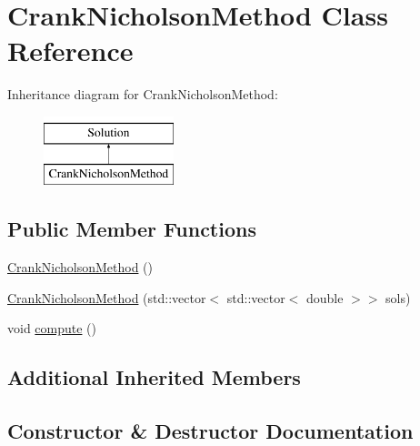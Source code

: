 \hypertarget{class_crank_nicholson_method}{}\section{Crank\+Nicholson\+Method Class Reference}
\label{class_crank_nicholson_method}
Inheritance diagram for Crank\+Nicholson\+Method\+:\begin{figure}[H]
\begin{center}
\leavevmode
\includegraphics[height=2.000000cm]{class_crank_nicholson_method}
\end{center}
\end{figure}
\subsection*{Public Member Functions}
\begin{DoxyCompactItemize}
\item 
\hyperlink{class_crank_nicholson_method_ae5052444cd3f042a554bb74d9ac556e0}{Crank\+Nicholson\+Method} ()
\item 
\hyperlink{class_crank_nicholson_method_a9738c40cac3d4f37775d6211544b178f}{Crank\+Nicholson\+Method} (std\+::vector$<$ std\+::vector$<$ double $>$$>$ sols)
\item 
void \hyperlink{class_crank_nicholson_method_a10558e5238673e11a76b4e10e8c588b4}{compute} ()
\end{DoxyCompactItemize}
\subsection*{Additional Inherited Members}


\subsection{Constructor \& Destructor Documentation}
\mbox{\label{class_crank_nicholson_method_ae5052444cd3f042a554bb74d9ac556e0}} 
